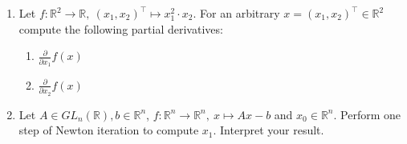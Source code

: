 \vspace*{-0.5cm}
\begin{enumerate}
		\item Let $f\colon \mathbb{R}^2 \to \mathbb{R},~(x_1,x_2)^\top \mapsto x_1^2 \cdot x_2$. For an arbitrary $x=(x_1,x_2)^\top \in \mathbb{R}^2$ compute the following partial derivatives:
	\begin{enumerate}
		\item $\frac{\partial}{\partial x_1} f(x)$
		\item $\frac{\partial}{\partial x_2} f(x)$
	\end{enumerate}
	\item Let $A\in GL_n(\mathbb{R}), b \in \mathbb{R}^n$, $f : \mathbb{R}^{n} \to \mathbb{R}^n, ~x \mapsto Ax -b $ and $x_0 \in \mathbb{R}^n$. Perform one step of Newton iteration to compute $x_1$. Interpret your result.
\end{enumerate}
 